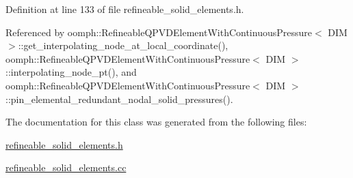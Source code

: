 Definition at line 133 of file refineable\+\_\+solid\+\_\+elements.\+h.



Referenced by oomph\+::\+Refineable\+Q\+P\+V\+D\+Element\+With\+Continuous\+Pressure$<$ D\+I\+M $>$\+::get\+\_\+interpolating\+\_\+node\+\_\+at\+\_\+local\+\_\+coordinate(), oomph\+::\+Refineable\+Q\+P\+V\+D\+Element\+With\+Continuous\+Pressure$<$ D\+I\+M $>$\+::interpolating\+\_\+node\+\_\+pt(), and oomph\+::\+Refineable\+Q\+P\+V\+D\+Element\+With\+Continuous\+Pressure$<$ D\+I\+M $>$\+::pin\+\_\+elemental\+\_\+redundant\+\_\+nodal\+\_\+solid\+\_\+pressures().



The documentation for this class was generated from the following files\+:\begin{DoxyCompactItemize}
\item 
\hyperlink{refineable__solid__elements_8h}{refineable\+\_\+solid\+\_\+elements.\+h}\item 
\hyperlink{refineable__solid__elements_8cc}{refineable\+\_\+solid\+\_\+elements.\+cc}\end{DoxyCompactItemize}
